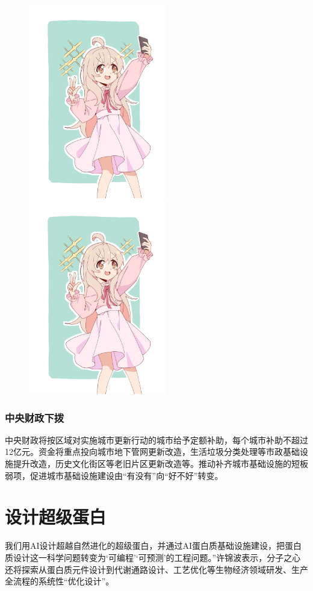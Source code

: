 \begin{figure}[htbp!]
	\centering
	\includegraphics[width=6cm]{图片/sample.jpg}
	\qquad
	\includegraphics[width=6cm]{图片/sample.jpg}
\end{figure}

\subsubsection{中央财政下拨}
中央财政将按区域对实施城市更新行动的城市给予定额补助，每个城市补助不超过12亿元。资金将重点投向城市地下管网更新改造，生活垃圾分类处理等市政基础设施提升改造，历史文化街区等老旧片区更新改造等。推动补齐城市基础设施的短板弱项，促进城市基础设施建设由“有没有”向“好不好”转变\cite{caimin2006,Peebles2001-100-100,Alice13}。

\section{设计超级蛋白}
我们用AI设计超越自然进化的超级蛋白，并通过AI蛋白质基础设施建设，把蛋白质设计这一科学问题转变为‘可编程’‘可预测’的工程问题。”许锦波表示，分子之心还将探索从蛋白质元件设计到代谢通路设计\cite{jin1993}、工艺优化等生物经济领域研发、生产全流程的系统性``优化设计''。
